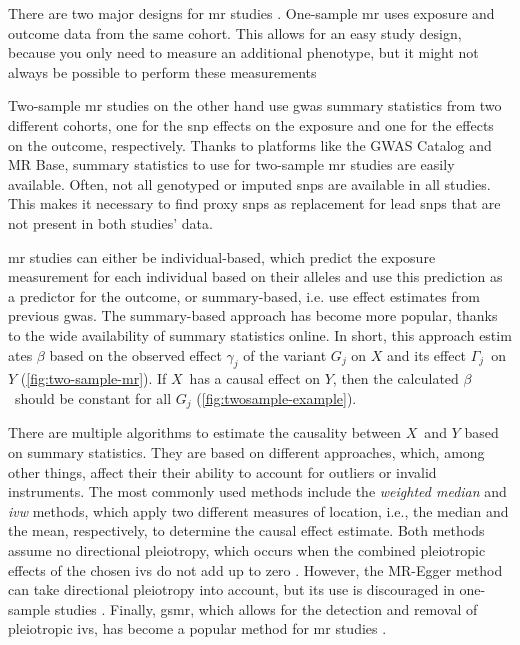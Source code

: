 \documentclass[twoside=false]{scrbook}
\begin{document}
There are two major designs for \gls{mr} studies \cite{Burgess2019}.
One-sample \gls{mr} uses exposure and outcome data from the same cohort.
This allows for an easy study design, because you only need to measure an additional phenotype, but it might not always be possible to perform these measurements 

Two-sample \gls{mr} studies on the other hand use \gls{gwas} summary statistics from two different cohorts, one for the \gls{snp} effects on the exposure and one for the effects on the outcome, respectively.
Thanks to platforms like the GWAS Catalog and MR Base, summary statistics to use for two-sample \gls{mr} studies are easily available.
Often, not all genotyped or imputed \glspl{snp} are available in all studies.
This makes it necessary to find proxy \glspl{snp} as replacement for lead \glspl{snp} that are not present in both studies' data.

\Gls{mr} studies can either be individual-based, which predict the exposure measurement for each individual based on their alleles and use this prediction as a predictor for the outcome, or summary-based, i.e. use effect estimates from previous \gls{gwas}.
The summary-based approach has become more popular, thanks to the wide availability of summary statistics online.
In short, this approach estim ates $\beta$ based on the observed effect $\gamma_j$ of the variant $G_j$ on $X$ and its effect $\Gamma_j$ on $Y$ (\cref{fig:two-sample-mr}).
If $X$ has a causal effect on $Y$, then the calculated $\beta$ should be constant for all $G_j$ (\cref{fig:twosample-example}).

There are multiple algorithms to estimate the causality between $X$ and $Y$ based on summary statistics.
They are based on different approaches, which, among other things, affect their their ability to account for outliers or invalid instruments.
The most commonly used methods include the \textit{weighted median} and \textit{\gls{ivw}} methods, which apply two different measures of location, i.e., the median and the mean, respectively, to determine the causal effect estimate. Both methods assume no directional pleiotropy, which occurs when the combined pleiotropic effects of the chosen \glspl{iv} do not add up to zero \cite{Burgess2013,Bowden2016}.
However, the MR-Egger method can take directional pleiotropy into account, but its use is discouraged in one-sample studies \cite{Bowden2015,Bowden2017}.
Finally, \gls{gsmr}, which allows for the detection and removal of pleiotropic \glspl{iv}, has become a popular method for \gls{mr} studies \cite{Zhu2018}.
\end{document}

